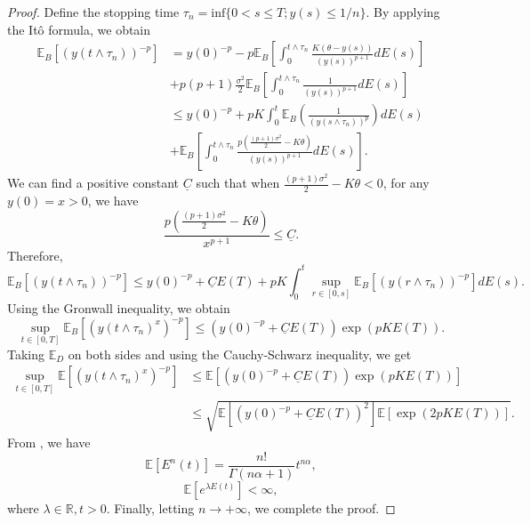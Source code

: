 \documentclass[10pt,reqno,final]{amsart}
\theoremstyle{plain}
\theoremstyle{definition}
\theoremstyle{remark}
\numberwithin{equation}{section}
\numberwithin{figure}{section}
\numberwithin{table}{section}
\begin{document}
\begin{proof}
	Define the stopping time $\tau_{n}=\mathrm{inf}\{0<s\leq T;y(s)\leq1/n\}$. By applying the Itô formula, we obtain
	$$\begin{aligned}
		\mathbb{E}_B\left[(y(t\wedge\tau_{n}))^{-p}\right] &= y(0)^{-p} - p\mathbb{E}_B\left[\int_{0}^{t\wedge\tau_{n}}\frac{K(\theta-y(s))}{(y(s))^{p+1}}dE(s)\right]\\
		&+ p(p+1)\frac{\sigma^{2}}{2}\mathbb{E}_B\left[\int_{0}^{t\wedge\tau_{n}}\frac{1}{(y(s))^{p+1}}dE(s)\right] \\
		&\leq y(0)^{-p} + pK\int_{0}^{t}\mathbb{E}_B\left(\frac{1}{(y(s\wedge\tau_{n}))^{p}}\right)dE(s) \\
		&+\mathbb{E}_B\left[\int_0^{t\wedge\tau_n}\frac{p\left(\frac{(p+1)\sigma^2}{2}-K\theta\right)}{(y(s))^{p+1}}dE(s)\right].
	\end{aligned}$$
	We can find a positive constant $\underline C$ such that when $\frac{(p+1)\sigma^2}{2}-K\theta<0$, for any $y(0)=x>0$, we have
	$$\frac{p\left(\frac{(p+1)\sigma^2}{2}-K\theta\right)}{x^{p+1}}\leq \underline C.$$
	Therefore,
	$$\mathbb{E}_B\left[(y(t\wedge\tau_n))^{-p}\right]\leq y(0)^{-p}+\underline{C}E(T)+pK\int_0^t\sup_{r\in[0,s]}\mathbb{E}_B\left[(y(r\wedge\tau_n))^{-p}\right]dE(s).$$
	Using the Gronwall inequality, we obtain
	$$\sup\limits_{t\in[0,T]}\mathbb{E}_B\left[(y(t\wedge\tau_n)^x)^{-p}\right]\leq\left(y(0)^{-p}+\underline{C}E(T)\right)\exp(pKE(T)).$$
	Taking $\mathbb{E}_D$ on both sides and using the Cauchy-Schwarz inequality, we get
	$$\begin{aligned}
		\sup\limits_{t\in[0,T]}\mathbb{E}\left[(y(t\wedge\tau_n)^x)^{-p}\right]&\leq\mathbb{E}\left[\left(y(0)^{-p}+\underline{C}E(T)\right)\exp(pKE(T))\right]\\
		&\leq\sqrt{\mathbb{E}\left[\left(y(0)^{-p}+\underline{C}E(T)\right)^2\right]\mathbb{E}\left[\exp(2pKE(T))\right]}.
	\end{aligned}$$
	From \cite{jum2014strong}, we have
	\begin{equation}
		\mathbb{E}[E^n(t)]=\frac{n!}{\Gamma(n\alpha+1)}t^{n\alpha},
	\end{equation}
	\begin{equation}
		\mathbb{E}[e^{\lambda E(t)}]<\infty,
	\end{equation}
	where $\lambda \in \mathbb{R}, t > 0$. Finally, letting $n \to +\infty$, we complete the proof.
\end{proof}
\end{document}

